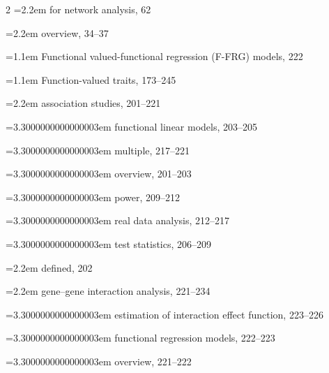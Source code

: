 \begin{multicols}{2}
\noindent\hangindent=2.2em \hspace*{1.1em}for network analysis, 62\par
\noindent\hangindent=2.2em \hspace*{1.1em}overview, 34--37\par
\noindent\hangindent=1.1em Functional valued-functional regression (F-FRG) models, 222\par
\noindent\hangindent=1.1em Function-valued traits, 173--245\par
\noindent\hangindent=2.2em \hspace*{1.1em}association studies, 201--221\par
\noindent\hangindent=3.3000000000000003em \hspace*{2.2em}functional linear models, 203--205\par
\noindent\hangindent=3.3000000000000003em \hspace*{2.2em}multiple, 217--221\par
\noindent\hangindent=3.3000000000000003em \hspace*{2.2em}overview, 201--203\par
\noindent\hangindent=3.3000000000000003em \hspace*{2.2em}power, 209--212\par
\noindent\hangindent=3.3000000000000003em \hspace*{2.2em}real data analysis, 212--217\par
\noindent\hangindent=3.3000000000000003em \hspace*{2.2em}test statistics, 206--209\par
\noindent\hangindent=2.2em \hspace*{1.1em}defined, 202\par
\noindent\hangindent=2.2em \hspace*{1.1em}gene--gene interaction analysis, 221--234\par
\noindent\hangindent=3.3000000000000003em \hspace*{2.2em}estimation of interaction effect function, 223--226\par
\noindent\hangindent=3.3000000000000003em \hspace*{2.2em}functional regression models, 222--223\par
\noindent\hangindent=3.3000000000000003em \hspace*{2.2em}overview, 221--222\par

\end{multicols}
